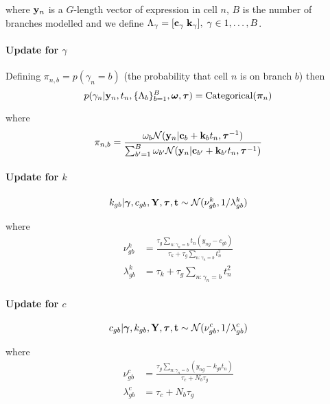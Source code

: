 where ${\bf y}_n$ is a $G$-length vector of expression in cell $n$, $B$ is the number of branches modelled and we define $\Lambda_\gamma = [ {\bf c}_\gamma \; {\bf k}_\gamma], \; \gamma \in 1, \ldots, B$.

\paragraph{Update for $\gamma$}

Defining $\pi_{n,b} = p(\gamma_n = b)$ (the probability that cell $n$ is on branch $b$) then
\begin{equation}
  p(\gamma_n | {\bf y}_n, t_n, \{ \Lambda_b \}_{b=1}^B, \bm \omega, {\bm \tau}) = \text{Categorical}(\bm \pi_{n})
\end{equation}

where
\begin{equation}
  \pi_{n,b} = \frac{\omega_b \mathcal{N}({\bf y}_n | {\bf c}_b + {\bf k}_b t_n, \bm \tau^{-1})}
  {\sum_{b'=1}^B \omega_{b'} \mathcal{N}({\bf y}_n | {\bf c}_{b'} + {\bf k}_{b'} t_n, \bm \tau^{-1}) }
\end{equation}

\paragraph{Update for $k$}
\begin{equation}
  k_{gb} | {\bm \gamma}, c_{gb}, {\bf Y}, {\bm \tau}, {\bf t} \sim \mathcal{N}(\nu^k_{gb}, 1 / \lambda^k_{gb})
\end{equation}

where
\begin{equation}
\begin{aligned}
\nu^k_{gb} & = \frac{\tau_g \sum_{n:\gamma_n = b}  t_n (y_{ng} - c_{gb})}{\tau_k +  \tau_g \sum_{n:\gamma_n = b}  t_n^2}\\
\lambda^k_{gb} & = \tau_k +  \tau_g \sum_{n:\gamma_n = b}  t_n^2
\end{aligned}
\end{equation}

\paragraph{Update for $c$}
\begin{equation}
  c_{gb} | {\bm \gamma}, k_{gb}, {\bf Y}, {\bm \tau}, {\bf t} \sim \mathcal{N}(\nu^c_{gb}, 1 / \lambda^c_{gb})
\end{equation}

where
\begin{equation}
\begin{aligned}
\nu^c_{gb} & = \frac{\tau_g \sum_{n:\gamma_n = b} (y_{ng} - k_{gb} t_n)}{\tau_c + N_b \tau_g}\\
\lambda^c_{gb} & = \tau_c + N_b \tau_g
\end{aligned}
\end{equation}

